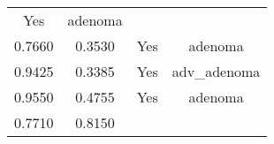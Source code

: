 \documentclass[12pt,]{article}
\begin{document}
\begin{longtable}[]{@{}cccc@{}}
\begin{minipage}[t]{0.22\columnwidth}
Yes\strut
\end{minipage} & \begin{minipage}[t]{0.16\columnwidth}\centering\strut
adenoma\strut
\end{minipage}\tabularnewline
\begin{minipage}[t]{0.24\columnwidth}\centering\strut
0.7660\strut
\end{minipage} & \begin{minipage}[t]{0.26\columnwidth}\centering\strut
0.3530\strut
\end{minipage} & \begin{minipage}[t]{0.22\columnwidth}\centering\strut
Yes\strut
\end{minipage} & \begin{minipage}[t]{0.16\columnwidth}\centering\strut
adenoma\strut
\end{minipage}\tabularnewline
\begin{minipage}[t]{0.24\columnwidth}\centering\strut
0.9425\strut
\end{minipage} & \begin{minipage}[t]{0.26\columnwidth}\centering\strut
0.3385\strut
\end{minipage} & \begin{minipage}[t]{0.22\columnwidth}\centering\strut
Yes\strut
\end{minipage} & \begin{minipage}[t]{0.16\columnwidth}\centering\strut
adv\_adenoma\strut
\end{minipage}\tabularnewline
\begin{minipage}[t]{0.24\columnwidth}\centering\strut
0.9550\strut
\end{minipage} & \begin{minipage}[t]{0.26\columnwidth}\centering\strut
0.4755\strut
\end{minipage} & \begin{minipage}[t]{0.22\columnwidth}\centering\strut
Yes\strut
\end{minipage} & \begin{minipage}[t]{0.16\columnwidth}\centering\strut
adenoma\strut
\end{minipage}\tabularnewline
\begin{minipage}[t]{0.24\columnwidth}\centering\strut
0.7710\strut
\end{minipage} & \begin{minipage}[t]{0.26\columnwidth}\centering\strut
0.8150\strut
\end{minipage} & \begin{minipage}[t]{0.22\columnwidth}\centering\strut

\end{minipage}
\end{longtable}
\end{document}
